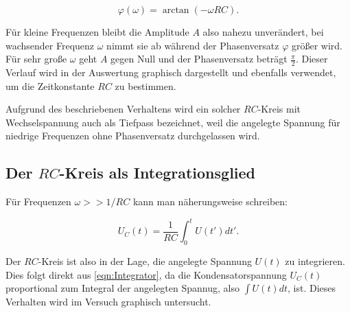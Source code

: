 \begin{equation}
    \varphi (\omega )=\arctan (-\omega RC). \label{eqn:Phasenversatz}
\end{equation}

Für kleine Frequenzen bleibt die Amplitude $A$ also nahezu unverändert, bei wachsender Frequenz $\omega$ nimmt sie ab während
der Phasenversatz $\varphi$ größer wird. Für sehr große $\omega$ geht $A$ gegen Null und der Phasenversatz beträgt $\frac{\pi}{2}$.
Dieser Verlauf wird in der Auswertung graphisch dargestellt und ebenfalls verwendet, um die Zeitkonstante $RC$ zu bestimmen.

Aufgrund des beschriebenen Verhaltens wird ein solcher $RC$-Kreis mit Wechselspannung auch als Tiefpass bezeichnet, weil die angelegte
Spannung für niedrige Frequenzen ohne Phasenversatz durchgelassen wird.

\subsection{Der $RC$-Kreis als Integrationsglied}
\label{sec:theorie-integration}
Für Frequenzen $\omega >> 1/RC$ kann man näherungsweise schreiben:

\begin{equation}
    U_{C}(t) = \frac{1}{RC}\int_{0}^{t}U({t}')d{t}'. \label{eqn:Integrator}
\end{equation}

Der $RC$-Kreis ist also in der Lage, die angelegte Spannung $U(t)$ zu integrieren. Dies folgt direkt aus \autoref{eqn:Integrator},
da die Kondensatorspannung $U_{C}(t)$ proportional zum Integral der angelegten Spannug, also $\int U(t)dt$, ist.
Dieses Verhalten wird im Versuch graphisch untersucht.